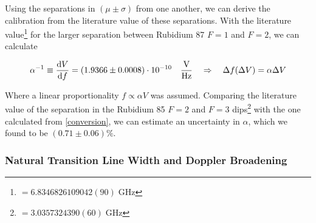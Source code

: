 \documentclass[12pt, a4paper]{article}
\begin{document}
Using the separations in $(\mu \pm \sigma)$ from one another, we can derive the calibration from the literature value of these separations. With the literature value\footnote{$= 6.8346826109042(90)\;\si{\giga\hertz}$\cite{script}} for the larger separation between Rubidium 87 $F = 1$ and $F = 2$, we can calculate

\begin{equation}
\alpha^{-1} \equiv \dv{V}{f} = (1.9366 \pm 0.0008) \cdot 10^{-10} \quad \si{\frac{\volt}{\hertz}} \quad \Rightarrow \quad \Delta f (\Delta V) = \alpha \Delta V
\label{conversion}
\end{equation}

Where a linear proportionality $f \propto \alpha V$ was assumed. Comparing the literature value of the separation in the Rubidium 85 $F = 2$ and $F = 3$ dips\footnote{$=3.0357324390(60) \;\si{\giga\hertz}$\cite{script}} with the one calculated from \autoref{conversion}, we can estimate an uncertainty in $\alpha$, which we found to be $(0.71 \pm 0.06) \%$.
\subsubsection{Natural Transition Line Width and Doppler Broadening}
\end{document}
